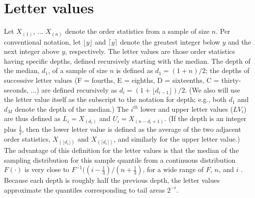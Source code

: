 \documentclass[oneside]{article}
\begin{document}
\section{Letter values}
\label{sec:letter-values}

Let $X_{(1)}$, ... $X_{(n)}$ denote the order statistics from a sample of size
$n$. Per conventional notation, let $\lfloor y \rfloor$ and $\lceil y \rceil$
denote the greatest integer below $y$ and the next integer above $y$,
respectively. The letter values are those order statistics having specific
depths, defined recursively starting with the median. The depth of the median,
$d_1$, of a sample of size $n$ is defined as $d_1 = (1 + n )/2$; the depths of
successive letter values (F = fourths, E = eighths, D = sixteenths, C =
thirty-seconds, ...) are defined recursively as $d_i = (1 + \lfloor d_{i-1}
\rfloor)/2$. (We also will use the letter value itself as the subscript to the
notation for depth; e.g., both $d_1$ and $d_M$ denote the depth of the
median.) The $i^{th}$ lower and upper letter values ($LV_i$) are thus defined
as $L_i = X_{(d_i)}$ and $U_i = X_{(n - d_i + 1)}$. (If the depth is an
integer plus $\frac{1}{2}$, then the lower letter value is defined as the
average of the two adjacent order statistics, $X_{(\lfloor d_i \rfloor)}$ and
$X_{(\lceil d_i \rceil)}$, and similarly for the upper letter value.) The
advantage of this definition for the letter values is that the median of the
sampling distribution for this sample quantile from a continuous distribution
$F(\cdot)$ is very close to $F^{-1} ((i - \frac{1}{3})/(n + \frac{1}{3})$, for
a wide range of $F$, $n$, and $i$ \citep{dchlv}. Because each depth is roughly
half the previous depth, the letter values approximate the quantiles
corresponding to tail areas $2^{-i}$.
\end{document}

